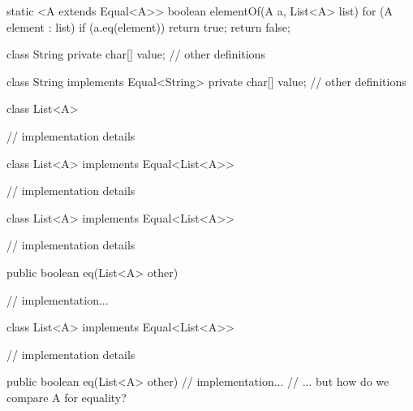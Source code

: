 \documentclass[usenames,dvipsnames,svgnames,table,aspectratio=169,mathserif]{beamer}
\begin{document}
\begin{frame}[fragile]
\begin{javacode}
static <A extends Equal<A>> boolean elementOf(A a, List<A> list) {
  for (A element : list) {
    if (a.eq(element)) return true;
  }
  return false;
}
\end{javacode}

\end{frame}


\begin{frame}[fragile]
\begin{javacode}
class String {
  private char[] value;
  // other definitions
}
\end{javacode}
\end{frame}


\begin{frame}[fragile]
\begin{javacode}
class String implements Equal<String> {
  private char[] value;
  // other definitions
}
\end{javacode}
\end{frame}


\begin{frame}[fragile]
\begin{javacode}
class List<A> {
  // implementation details





}
\end{javacode}
\end{frame}


\begin{frame}[fragile]
\begin{javacode}
class List<A> implements Equal<List<A>> {
  // implementation details





}
\end{javacode}
\end{frame}


\begin{frame}[fragile]
\begin{javacode}
class List<A> implements Equal<List<A>> {
  // implementation details

  public boolean eq(List<A> other) {
    // implementation...

  }
}
\end{javacode}
\end{frame}


\begin{frame}[fragile]
\begin{javacode}
class List<A> implements Equal<List<A>> {
  // implementation details

  public boolean eq(List<A> other) {
    // implementation...
    // ... but how do we compare A for equality?
  }
}
\end{javacode}
\end{frame}
\end{document}
